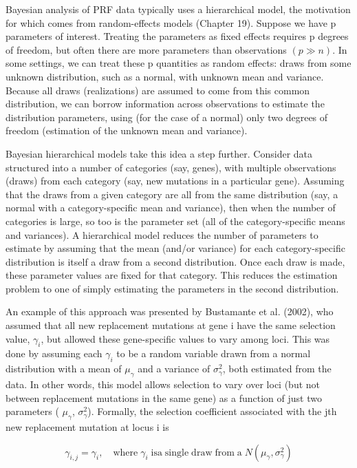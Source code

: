 \documentclass{article}
\begin{document}
Bayesian analysis of PRF data typically uses a hierarchical model, the motivation for which comes from random-effects models (Chapter 19). Suppose we have p parameters of interest. Treating the parameters as fixed effects requires p degrees of freedom, but often there are more parameters than observations  $ (p \gg n) $. In some settings, we can treat these p quantities as random effects: draws from some unknown distribution, such as a normal, with unknown mean and variance. Because all draws (realizations) are assumed to come from this common distribution, we can borrow information across observations to estimate the distribution parameters, using (for the case of a normal) only two degrees of freedom (estimation of the unknown mean and variance).

Bayesian hierarchical models take this idea a step further. Consider data structured into a number of categories (say, genes), with multiple observations (draws) from each category (say, new mutations in a particular gene). Assuming that the draws from a given category are all from the same distribution (say, a normal with a category-specific mean and variance), then when the number of categories is large, so too is the parameter set (all of the category-specific means and variances). A hierarchical model reduces the number of parameters to estimate by assuming that the mean (and/or variance) for each category-specific distribution is itself a draw from a second distribution. Once each draw is made, these parameter values are fixed for that category. This reduces the estimation problem to one of simply estimating the parameters in the second distribution.

An example of this approach was presented by Bustamante et al. (2002), who assumed that all new replacement mutations at gene i have the same selection value,  $ \gamma_i $, but allowed these gene-specific values to vary among loci. This was done by assuming each  $ \gamma_i $ to be a random variable drawn from a normal distribution with a mean of  $ \mu_\gamma $ and a variance of  $ \sigma_\gamma^2 $, both estimated from the data. In other words, this model allows selection to vary over loci (but not between replacement mutations in the same gene) as a function of just two parameters ( $ \mu_\gamma $,  $ \sigma_\gamma^2 $). Formally, the selection coefficient associated with the jth new replacement mutation at locus i is

\begin{equation}
\gamma_{i,j}=\gamma_{i},\quad\mathrm{w h e r e}\;\gamma_{i}\;\mathrm{i s a\;s i n g l e\;d r a w\;f r o m\;a}\;N(\mu_{\gamma},\sigma_{\gamma}^{2})
\tag{10.17a}
\label{eq:10_17a}
\end{equation}
\end{document}
